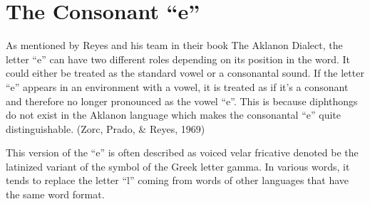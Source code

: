 \section{The Consonant “e”}
As mentioned by Reyes and his team in their book The Aklanon Dialect, the letter “e” can have two different roles depending on its position in the word. It could either be treated as the standard vowel or a consonantal sound. If the letter “e” appears in an environment with a vowel, it is treated as if it’s a consonant and therefore no longer pronounced as the vowel “e”. This is because diphthongs do not exist in the Aklanon language which makes the consonantal “e” quite distinguishable. (Zorc, Prado, \& Reyes, 1969)

This version of the “e” is often described as voiced velar fricative denoted be the latinized variant of the symbol of the Greek letter gamma. In various words, it tends to replace the letter “l” coming from words of other languages that have the same word format.
